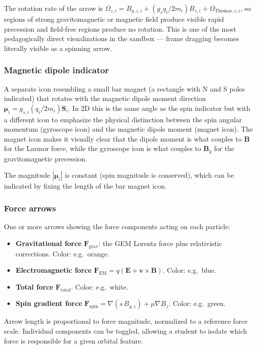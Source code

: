 \documentclass[11pt,a4paper]{article}
\newcommand{\vv}[1]{\mathbf{#1}}
\begin{document}
The rotation rate of the arrow is $\Omega_{z,i} = B_{g,z,i} + (g_s q_i/2m_i)B_{z,i} + \Omega_{\mathrm{Thomas},z,i}$, so regions of strong gravitomagnetic or magnetic field produce visible rapid precession and field-free regions produce no rotation.  This is one of the most pedagogically direct visualizations in the sandbox --- frame dragging becomes literally visible as a spinning arrow.

\subsubsection*{Magnetic dipole indicator}

A separate icon resembling a small bar magnet (a rectangle with N and S poles indicated) that rotates with the magnetic dipole moment direction $\boldsymbol{\mu}_i = g_{s,i}(q_i/2m_i)\vv{S}_i$.  In 2D this is the same angle as the spin indicator but with a different icon to emphasize the physical distinction between the spin angular momentum (gyroscope icon) and the magnetic dipole moment (magnet icon).  The magnet icon makes it visually clear that the dipole moment is what couples to $\vv{B}$ for the Larmor force, while the gyroscope icon is what couples to $\vv{B}_g$ for the gravitomagnetic precession.

The magnitude $|\boldsymbol{\mu}_i|$ is constant (spin magnitude is conserved), which can be indicated by fixing the length of the bar magnet icon.

\subsubsection*{Force arrows}

One or more arrows showing the force components acting on each particle:
\begin{itemize}
  \item \textbf{Gravitational force} $\vv{F}_{\mathrm{grav}}$: the GEM Lorentz force plus relativistic corrections.  Color: e.g.\ orange.
  \item \textbf{Electromagnetic force} $\vv{F}_{\mathrm{EM}} = q(\vv{E}+\vv{v}\times\vv{B})$.  Color: e.g.\ blue.
  \item \textbf{Total force} $\vv{F}_{\mathrm{total}}$.  Color: e.g.\ white.
  \item \textbf{Spin gradient force} $\vv{F}_{\mathrm{spin}} = \nabla(s\,B_{g,z}) + \mu\nabla B_z$.  Color: e.g.\ green.
\end{itemize}
Arrow length is proportional to force magnitude, normalized to a reference force scale.  Individual components can be toggled, allowing a student to isolate which force is responsible for a given orbital feature.
\end{document}
